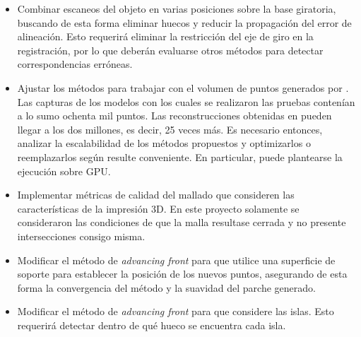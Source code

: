 \begin{itemize}
	\item Combinar escaneos del objeto en varias posiciones sobre la base giratoria,
		buscando de esta forma eliminar huecos y reducir la propagación del error de alineación.
		Esto requerirá eliminar la restricción del eje de giro en la
		registración, por lo que deberán evaluarse otros métodos para detectar
		correspondencias erróneas.
	\item Ajustar los métodos para trabajar con el volumen de puntos generados
		por \cite{Pancho}.  Las capturas de los modelos con los cuales se
		realizaron las pruebas contenían a lo sumo ochenta mil puntos. Las
		reconstrucciones obtenidas en \cite{Pancho} pueden llegar a los
		dos millones, es decir, 25 veces más.
		Es necesario entonces, analizar la escalabilidad de los métodos
		propuestos y optimizarlos o reemplazarlos según resulte conveniente.
		En particular, puede plantearse la ejecución sobre GPU.
	\item Implementar métricas de calidad del mallado que consideren las
		características de la impresión 3D.
		En este proyecto solamente se consideraron las condiciones de que la malla
		resultase cerrada y no presente intersecciones consigo misma.
	\item Modificar el método de \emph{advancing front} para que utilice una
		superficie de soporte para establecer la posición de los nuevos puntos,
		asegurando de esta forma la convergencia del método y la suavidad del
		parche generado.
	\item Modificar el método de \emph{advancing front} para que considere las islas.
		Esto requerirá detectar dentro de qué hueco se encuentra cada isla.
\end{itemize}
